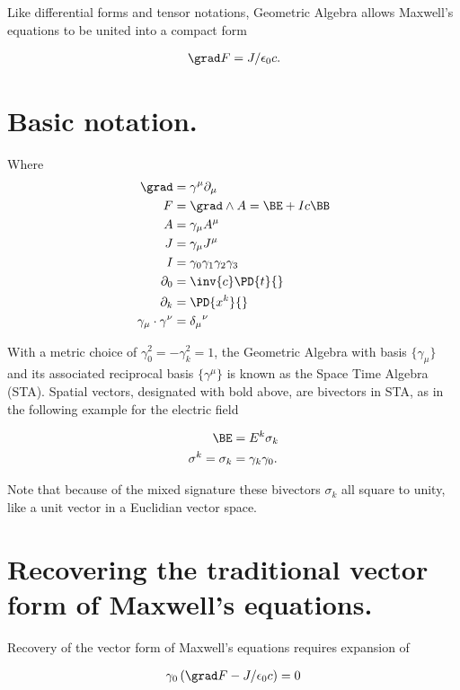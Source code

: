 Like differential forms and tensor notations, Geometric Algebra allows Maxwell's equations to be united into a compact form

\begin{align*}
\grad F = J/\epsilon_0 c.
\end{align*}

\section{Basic notation.}
Where 
\begin{align*}
\grad &= \gamma^\mu \partial_\mu \\
F &= \grad \wedge A = \BE + I c \BB \\
A &= \gamma_\mu A^\mu \\
J &= \gamma_\mu J^\mu \\
I &= \gamma_0 \gamma_1 \gamma_2 \gamma_3 \\
\partial_0 &= \inv{c} \PD{t}{} \\
\partial_k &= \PD{x^k}{} \\
\gamma_\mu \cdot \gamma^\nu &= {\delta_\mu}^\nu 
\end{align*}

With a metric choice of $\gamma_0^2 = -\gamma_k^2 = 1$, the Geometric Algebra with basis $\{\gamma_\mu\}$ and its associated reciprocal basis $\{\gamma^\mu\}$ is known as the Space Time Algebra (STA).  Spatial vectors, designated with bold above, are bivectors in STA, as in the following example for the electric field

\begin{align*}
\BE &= E^k \sigma_k \\
\sigma^k = \sigma_k &= \gamma_k \gamma_0.
\end{align*}

Note that because of the mixed signature these bivectors $\sigma_k$ all square to unity, like a unit vector in a Euclidian vector space.

\section{Recovering the traditional vector form of Maxwell's equations.}

Recovery of the vector form of Maxwell's equations requires expansion of

\begin{align*}
\gamma_0 \left( \grad F - J/\epsilon_0 c \right) = 0 
\end{align*}

